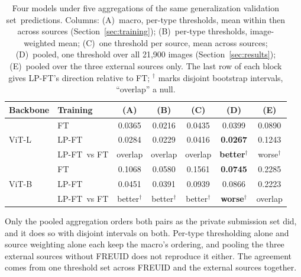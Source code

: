 \documentclass[10pt]{article}
\newcommand{\lpft}{LP-FT}
\newcommand{\genval}{generalization validation set}
\begin{document}
\begin{table}[h]
  \caption{Four models under five aggregations of the same \genval\ predictions. Columns: (A)~macro, per-type thresholds, mean within then across sources (Section~\ref{sec:training}); (B)~per-type thresholds, image-weighted mean; (C)~one threshold per source, mean across sources; (D)~pooled, one threshold over all 21,900 images (Section~\ref{sec:results}); (E)~pooled over the three external sources only. The last row of each block gives \lpft's direction relative to FT; $^\dagger$ marks disjoint bootstrap intervals, ``overlap'' a null.}
  \label{tab:aggregations}
  \centering
  \footnotesize
  \begin{tabular}{@{}llccccc@{}}
    \toprule
    Backbone & Training & (A) & (B) & (C) & (D) & (E) \\
    \midrule
    \multirow{3}{*}{ViT-L} & FT    & 0.0365 & 0.0216 & 0.0435 & 0.0399 & 0.0890 \\
                           & \lpft & 0.0284 & 0.0229 & 0.0416 & \textbf{0.0267} & 0.1243 \\
                           & \lpft\ vs FT & overlap & overlap & overlap & \textbf{better}$^\dagger$ & worse$^\dagger$ \\
    \midrule
    \multirow{3}{*}{ViT-B} & FT    & 0.1068 & 0.0580 & 0.1561 & \textbf{0.0745} & 0.2285 \\
                           & \lpft & 0.0451 & 0.0391 & 0.0939 & 0.0866 & 0.2223 \\
                           & \lpft\ vs FT & better$^\dagger$ & better$^\dagger$ & better$^\dagger$ & \textbf{worse}$^\dagger$ & overlap \\
    \bottomrule
  \end{tabular}
\end{table}

Only the pooled aggregation orders both pairs as the private submission set did, and it does so with disjoint intervals on both. Per-type thresholding alone and source weighting alone each keep the macro's ordering, and pooling the three external sources without FREUID does not reproduce it either. The agreement comes from one threshold set across FREUID and the external sources together.
\end{document}
